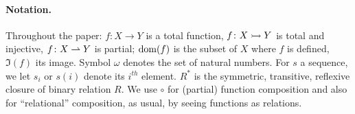 \paragraph{Notation.} 
Throughout the paper: $f \colon X \to Y$ is a total function, $f \colon X \rightarrowtail Y$ is total and injective, $f \colon X \rightharpoonup Y$ is partial; $\operatorname{dom}(f)$ is the subset of $X$ where $f$ is defined, $\Im(f)$ its image. Symbol $\omega$ denotes the set of natural numbers. For $s$ a sequence, we let $s_i$ or $s(i)$ denote its $i^{\mathit{th}}$ element. $R^*$ is the symmetric, transitive, reflexive closure of binary relation $R$. We use $\circ$ for (partial) function composition and also for ``relational'' composition, as usual, by seeing functions as relations.


